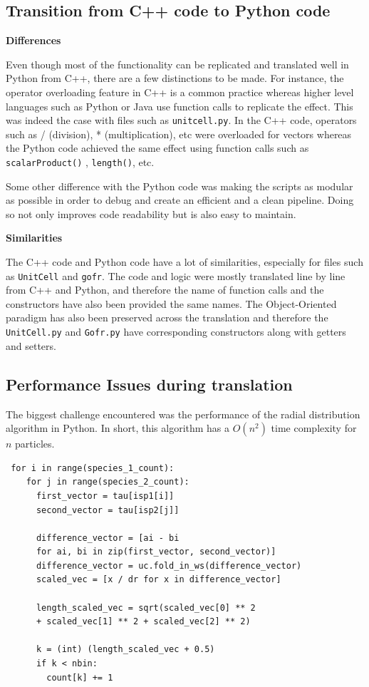 \subsection*{Transition from C++ code to Python code}


\textbf{Differences}

Even though most of the functionality can be replicated and translated well in Python from C++, there are a few distinctions to be made. For instance, the operator overloading feature in C++ is a common practice whereas higher level languages such as Python or Java use function calls to replicate the effect. This was indeed the case with files such as \verb|unitcell.py|. In the C++ code, operators such as / (division), * (multiplication), etc were overloaded for vectors whereas the Python code achieved the same effect using function calls such as \verb|scalarProduct()| , \verb|length()|, etc.

Some other difference with the Python code was making the scripts as modular as possible in order to debug and create an efficient and a clean pipeline. Doing so not only improves code readability but is also easy to maintain. 

\textbf{Similarities}

The C++ code and Python code have a lot of similarities, especially for files such as \verb|UnitCell| and \verb|gofr|. The code and logic were mostly translated line by line from C++ and Python, and therefore the name of function calls and the constructors have also been provided the same names. The Object-Oriented paradigm has also been preserved across the translation and therefore the \verb|UnitCell.py| and \verb|Gofr.py| have corresponding constructors along with getters and setters. 

\subsection*{Performance Issues during translation}

The biggest challenge encountered was the performance of the radial distribution algorithm in Python. In short, this algorithm has a $O(n^2)$ time complexity for $n$ particles.  

\singlespacing
\begin{verbatim}
 for i in range(species_1_count):
    for j in range(species_2_count):
      first_vector = tau[isp1[i]]
      second_vector = tau[isp2[j]]
      
      difference_vector = [ai - bi 
      for ai, bi in zip(first_vector, second_vector)]
      difference_vector = uc.fold_in_ws(difference_vector)
      scaled_vec = [x / dr for x in difference_vector]
      
      length_scaled_vec = sqrt(scaled_vec[0] ** 2 
      + scaled_vec[1] ** 2 + scaled_vec[2] ** 2)
     
      k = (int) (length_scaled_vec + 0.5)
      if k < nbin:
        count[k] += 1
\end{verbatim}

